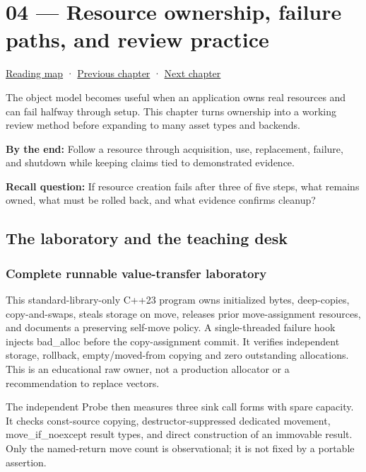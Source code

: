 \hypertarget{05-engine-i-ch004}{}
\chapter{04 --- Resource ownership, failure paths, and review practice}\label{05-engine-i-ch004-resource-ownership-failure-paths-and-review-practice}

\hyperref[volume-reading-map]{Reading map} · \hyperref[05-engine-i-ch003-object-representation-lifetime-and-enforceable-promises]{Previous chapter} · \hyperref[05-engine-i-ch005-generic-asset-pipelines-with-stable-identity]{Next chapter}

The object model becomes useful when an application owns real resources and can fail halfway through setup. This chapter turns ownership into a working review method before expanding to many asset types and backends.

\textbf{By the end:} Follow a resource through acquisition, use, replacement, failure, and shutdown while keeping claims tied to demonstrated evidence.

\textbf{Recall question:} If resource creation fails after three of five steps, what remains owned, what must be rolled back, and what evidence confirms cleanup?

\section{The laboratory and the teaching desk}\label{05-engine-i-ch004-the-laboratory-and-the-teaching-desk}

\subsection{Complete runnable value-transfer laboratory}\label{05-engine-i-ch004-complete-runnable-value-transfer-laboratory}

This standard-library-only C++23 program owns initialized bytes, deep-copies, copy-and-swaps, steals storage on move, releases prior move-assignment resources, and documents a preserving self-move policy. A single-threaded failure hook injects bad\_alloc before the copy-assignment commit. It verifies independent storage, rollback, empty/moved-from copying and zero outstanding allocations. This is an educational raw owner, not a production allocator or a recommendation to replace vectors.

The independent Probe then measures three sink call forms with spare capacity. It checks const-source copying, destructor-suppressed dedicated movement, move\_if\_noexcept result types, and direct construction of an immovable result. Only the named-return move count is observational; it is not fixed by a portable assertion.

